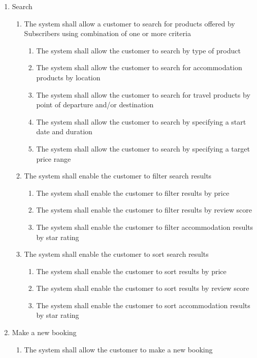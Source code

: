 \documentclass{article}
\begin{document}
\begin{enumerate}
	\item Search
	\begin{enumerate}
		\item The system shall allow a customer to search for products offered by Subscribers using combination of one or more criteria
		\begin{enumerate}
			\item The system shall allow the customer to search by type of product
			\item The system shall allow the customer to search for accommodation products by location
			\item The system shall allow the customer to search for travel products by point of departure and/or destination
			\item The system shall allow the customer to search by specifying a start date and duration
			\item The system shall allow the customer to search by specifying a target price range
		\end{enumerate}
		\item The system shall enable the customer to filter search results
		\begin{enumerate}
			\item The system shall enable the customer to filter results by price
			\item The system shall enable the customer to filter results by review score
			\item The system shall enable the customer to filter accommodation results by star rating
		\end{enumerate}
		\item The system shall enable the customer to sort search results
		\begin{enumerate}
			\item The system shall enable the customer to sort results by price
			\item The system shall enable the customer to sort results by review score
			\item The system shall enable the customer to sort accommodation results by star rating
		\end{enumerate}
	\end{enumerate}

	\item Make a new booking
	\begin{enumerate}
		\item The system shall allow the customer to make a new booking
	\end{enumerate}


\end{enumerate}
\end{document}

